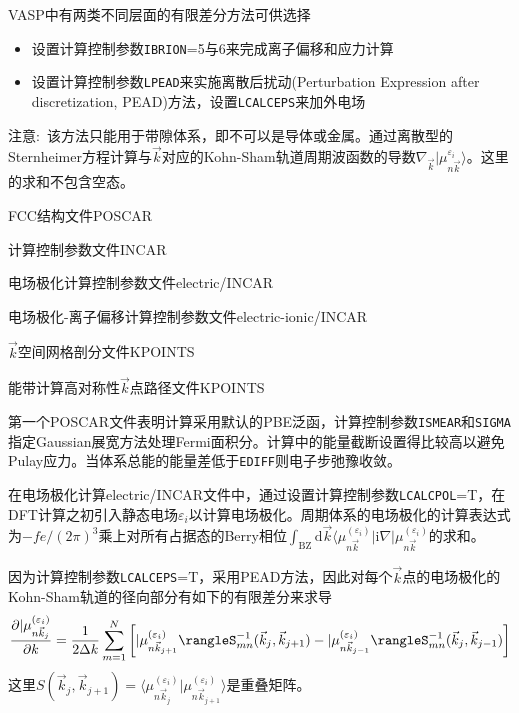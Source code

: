\textrm{VASP}中有两类不同层面的有限差分方法可供选择
\begin{itemize}
	\item 设置计算控制参数\texttt{IBRION}=5与6来完成离子偏移和应力计算
	\item 设置计算控制参数\texttt{LPEAD}来实施离散后扰动\textrm{(Perturbation Expression after discretization, PEAD)}方法，设置\texttt{LCALCEPS}来加外电场
\end{itemize}
注意:~该方法只能用于带隙体系，即不可以是导体或金属。通过离散型的\textrm{Sternheimer}方程计算与$\vec k$对应的\textrm{Kohn-Sham}轨道周期波函数的导数$\nabla_{\vec k}|\mu_{n\vec k}^{\varepsilon_i}\rangle$。这里的求和不包含空态。

\textrm{FCC}结构文件\textrm{POSCAR}

计算控制参数文件\textrm{INCAR}

电场极化计算控制参数文件\textrm{electric/INCAR}

电场极化-离子偏移计算控制参数文件\textrm{electric-ionic/INCAR}

$\vec k$空间网格剖分文件\textrm{KPOINTS}

能带计算高对称性$\vec k$点路径文件\textrm{KPOINTS}

第一个\textrm{POSCAR}文件表明计算采用默认的\textrm{PBE}泛函，计算控制参数\texttt{ISMEAR}和\texttt{SIGMA}指定\textrm{Gaussian}展宽方法处理\textrm{Fermi}面积分。计算中的能量截断设置得比较高以避免\textrm{Pulay}应力。当体系总能的能量差低于\texttt{EDIFF}则电子步弛豫收敛。

在电场极化计算\textrm{electric/INCAR}文件中，通过设置计算控制参数\texttt{LCALCPOL}=\textrm{T}，在\textrm{DFT}计算之初引入静态电场$\varepsilon_i$以计算电场极化。周期体系的电场极化的计算表达式为$-fe/(2\pi)^3$乘上对所有占据态的\textrm{Berry}相位$\int_{\mathrm{BZ}}\mathrm{d}\vec k\langle\mu_{n\vec k}^{(\varepsilon_i)}|\mathrm{i}\nabla|\mu_{n\vec k}^{(\varepsilon_i)}$的求和。

因为计算控制参数\texttt{LCALCEPS}=\textrm{T}，采用\textrm{PEAD}方法，因此对每个$\vec k$点的电场极化的\textrm{Kohn-Sham}轨道的径向部分有如下的有限差分来求导
\begin{displaymath}
	\dfrac{\partial|\mu_{n\vec k_j}^{(\varepsilon_i)}}{\partial k}=\dfrac1{2\Delta k}\sum_{m=1}^{N}\bigg[|\mu_{n\vec k_{j+1}}^{(\varepsilon_i)}\rangleS_{mn}^{-1}(\vec k_j,\vec k_{j+1})-|\mu_{n\vec k_{j-1}}^{(\varepsilon_i)}\rangleS_{mn}^{-1}(\vec k_j,\vec k_{j-1})\bigg]
\end{displaymath}
这里$S(\vec k_j,\vec k_{j+1})=\langle\mu_{n\vec k_j}^{(\varepsilon_i)}|\mu_{n\vec k_{j+1}}^{(\varepsilon_i)}\rangle$是重叠矩阵。

